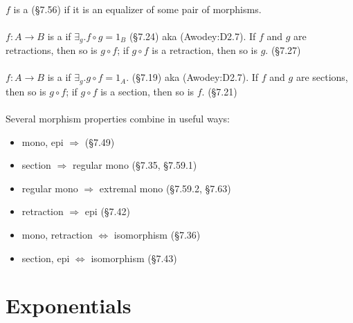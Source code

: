 \documentclass[10pt,twocolumn,letterpaper]{article}
\begin{document}
  \paragraph{}
  $f$ is a  (\S7.56) if it is an equalizer of
  some pair of morphisms.

  \paragraph{}
  $f : A \to B$ is a  if $\exists_g . f \circ g = 1_B$
  (\S7.24) aka  (Awodey:D2.7).  If $f$ and $g$ are
  retractions, then so is $g \circ f$; if $g \circ f$ is a retraction, then
  so is $g$. (\S7.27)

  \paragraph{}
  $f : A \to B$ is a  if $\exists_g . g \circ f = 1_A$.
  (\S7.19) aka  (Awodey:D2.7).
  If $f$ and $g$ are sections, then so is $g \circ f$;
  if $g \circ f$ is a section, then so is $f$. (\S7.21)

  \paragraph{}
  Several morphism properties combine in useful ways:
  \begin{itemize}
    \item mono, epi $\Rightarrow$  (\S7.49)
    \item section $\Rightarrow$ regular mono (\S7.35, \S7.59.1)
    \item regular mono $\Rightarrow$ extremal mono (\S7.59.2, \S7.63)
    \item retraction $\Rightarrow$ epi (\S7.42)
    \item mono, retraction $\Leftrightarrow$ isomorphism (\S7.36)
    \item section, epi $\Leftrightarrow$ isomorphism (\S7.43)
  \end{itemize}

\section{Exponentials} %
\end{document}
